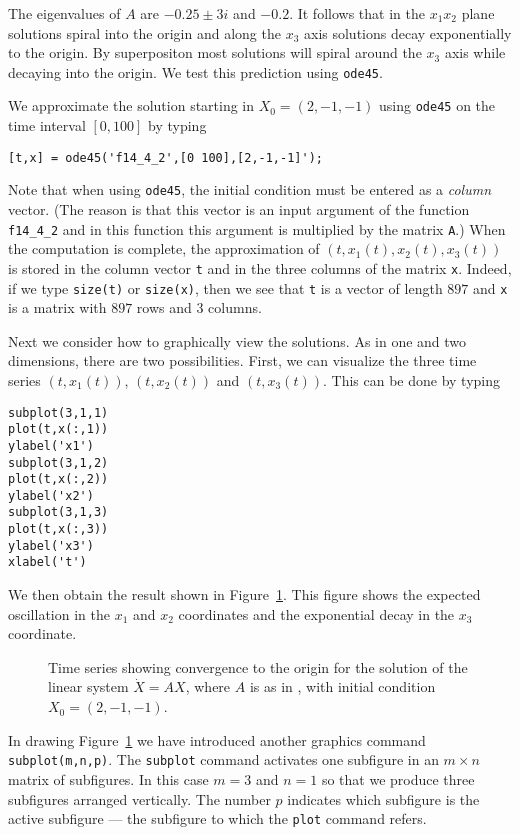 \documentclass{ximera}
\begin{document}
The eigenvalues of $A$ are $-0.25\pm 3i$ and $-0.2$.  It follows that in the 
$x_1x_2$ plane solutions spiral into the origin and along the $x_3$ axis 
solutions decay exponentially to the origin.  By superpositon most solutions
will spiral around the $x_3$ axis while decaying into the origin.  We test 
this prediction using {\tt ode45}.

We approximate the solution starting in $X_0=(2,-1,-1)$ using
{\tt ode45} on the time interval $[0,100]$ by typing
\begin{verbatim}
[t,x] = ode45('f14_4_2',[0 100],[2,-1,-1]');
\end{verbatim}
Note that when using {\tt ode45}, the 
initial condition must be entered 
as a {\em column\/} vector.   (The reason is that this vector is an
input argument of the function {\tt f14\_4\_2} and in this function
this argument is multiplied by the matrix {\tt A}.)  When the computation 
is complete, 
the approximation of $(t,x_1(t),x_2(t),x_3(t))$ is stored in the column 
vector {\tt t} and in the three columns of the matrix {\tt x}.  Indeed, if 
we type {\tt size(t)} or {\tt size(x)}, then we see that {\tt t} is a 
vector of length $897$ and {\tt x} is a matrix with $897$ rows and $3$ 
columns.  

Next we consider how to graphically view the solutions.  As in one and
two dimensions, there are two possibilities.  First, we can visualize 
the three time series 
$(t,x_1(t))$, $(t,x_2(t))$ and $(t,x_3(t))$.  
This can be done by typing
\begin{verbatim}
subplot(3,1,1)
plot(t,x(:,1))
ylabel('x1')
subplot(3,1,2)
plot(t,x(:,2))
ylabel('x2')
subplot(3,1,3)
plot(t,x(:,3))
ylabel('x3')
xlabel('t')
\end{verbatim}
We then obtain the result shown in Figure~\ref{fig:flinear1}.  This figure 
shows the expected oscillation in the $x_1$ and $x_2$ coordinates and the 
exponential decay in the $x_3$ coordinate.
\begin{figure}[htb]
   \centerline{%
   }
   \caption{Time series showing convergence to the origin for the solution 
	of the linear system $\dot X=AX$, where $A$ is as in 
	\protect{}, with initial condition $X_0=(2,-1,-1)$.}
   \label{fig:flinear1}
\end{figure}

In drawing Figure~\ref{fig:flinear1} we have introduced another \Matlab 
graphics command {\tt subplot(m,n,p)}.  
The {\tt subplot} command activates one 
subfigure in an $m\times n$ matrix of subfigures.  In this case $m=3$ 
and $n=1$ so that we produce three subfigures arranged vertically.  
The number $p$ indicates which subfigure is the active subfigure --- the 
subfigure to which the {\tt plot} command refers.
\end{document}

